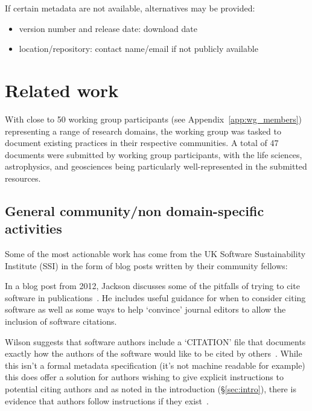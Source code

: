 \documentclass[11pt, oneside]{amsart}
\begin{document}
If certain metadata are not available, alternatives may be provided:
\begin{itemize}
\item version number and release date: download date
\item location\slash repository: contact name\slash email if not publicly
  available
\end{itemize}


\section{Related work}
\label{sec:related_work}

With close to 50 working group participants (see Appendix~\ref{app:wg_members}) representing a range of research domains, the working group was tasked to
document existing practices in their respective communities. A total of 47 documents were submitted by working group
participants, with the life sciences, astrophysics, and geosciences being particularly well-represented in the submitted
resources.

\subsection{General community/non domain-specific activities}

Some of the most actionable work has come from the UK Software Sustainability Institute (SSI) in the form of blog posts written by their community fellows:

In a blog post from 2012, Jackson discusses some of the pitfalls of trying to cite software in publications~\cite{ssi-how-to-cite}.
He includes useful guidance for when to consider citing software as well as some ways to help `convince' journal editors
to allow the inclusion of software citations.

Wilson suggests that software authors include a `CITATION' file that documents exactly how the
authors of the software would like to be cited by others~\cite{ssi-citation-files}. While this isn't a formal metadata specification (it's not machine
readable for example) this does offer a solution for authors wishing to give explicit instructions to potential citing authors and as noted in the introduction (\S\ref{sec:intro}), there is evidence that authors follow instructions if they exist~\cite{10.1371/journal.pone.0136631}.
\end{document}
